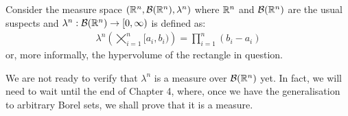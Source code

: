 \begin{eg}
\begin{enumerate}
	Consider the measure space $(\mathbb{R}^n, \mathcal{B}(\mathbb{R}^n), \lambda^n)$ where $\mathbb{R}^n$ and $\mathcal{B}(\mathbb{R}^n)$ are the usual suspects and $\lambda^n : \mathcal{B}(\mathbb{R}^n) \to [0, \infty)$ is defined as:
	\begin{align*}
		\lambda^n\left(\bigtimes_{i = 1}^n [a_i, b_i)\right) = \prod_{i=1}^{n} (b_i - a_i)
	\end{align*}
	or, more informally, the hypervolume of the rectangle in question.
	
	We are not ready to verify that $\lambda^n$ is a measure over $\mathcal{B}(\mathbb{R}^n)$ yet. In fact, we will need to wait until the end of Chapter 4, where, once we have the generalisation to arbitrary Borel sets, we shall prove that it is a measure.
	\end{enumerate}
\end{eg}